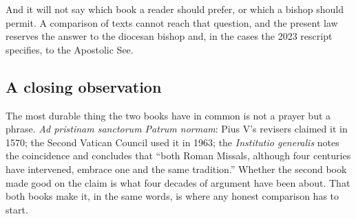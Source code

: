 And it will not say which book a reader should prefer, or which a bishop should permit. A comparison of texts cannot reach that question, and the present law reserves the answer to the diocesan bishop and, in the cases the 2023 rescript specifies, to the Apostolic See.

\subsection{A closing observation}

The most durable thing the two books have in common is not a prayer but a phrase. \emph{Ad pristinam sanctorum Patrum normam}: Pius V's revisers claimed it in 1570; the Second Vatican Council used it in 1963; the \emph{Institutio generalis} notes the coincidence and concludes that ``both Roman Missals, although four centuries have intervened, embrace one and the same tradition.'' Whether the second book made good on the claim is what four decades of argument have been about. That both books make it, in the same words, is where any honest comparison has to start.

